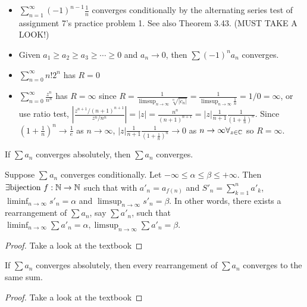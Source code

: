 \begin{example}
	\begin{itemize}
		\item $\sum_{n=1}^{\infty}{(-1)^{n-1}\frac{1}{n}}$ converges conditionally by the alternating series test of assignment 7's practice problem 1. See also Theorem 3.43. (MUST TAKE A LOOK!)
		\item Given $a_1\ge a_2\ge a_3\ge \cdots \ge 0$ and $a_{n}\to 0$, then $\sum{(-1)^{n}a_{n}}$ converges.
		\item $\sum_{n=0}^{\infty}{n!2^{n}}$ has $R=0$
		\item $\sum_{n=0}^{\infty}{\frac{z^{n}}{n^{n}}}$ has $R=\infty$ since $R=\frac{1}{\limsup_{n\to \infty}{\sqrt[n]{|c_{n}|}}}=\frac{1}{\limsup_{n\to \infty}{\frac{1}{n}}}=1/0=\infty$, or use ratio test, $|\frac{z^{n+1}/(n+1)^{n+1}}{z^{n}/n^{n}}|=|z|=\frac{n^{n}}{(n+1)^{n+1}}=|z|\frac{1}{n+1} \frac{1}{(1+\frac{1}{n})^{n}}$.
		      Since $(1+\frac{1}{n})^{n} \to  \frac{1}{e}$ as $n\to \infty$,
		      $|z|\frac{1}{n+1} \frac{1}{(1+\frac{1}{n})^{n}} \to 0$ as $n\to \infty \forall_{z \in \mathbb{C}}$ so $R=\infty$.
	\end{itemize}
\end{example}

\begin{thm}[45]
	If $\sum{a_{n}}$ converges absolutely, then $\sum{a_{n}}$ converges.
\end{thm}

\begin{thm}[54]
	Suppose $\sum_{}{a_{n}}$ converges conditionally.
	Let $-\infty\le \alpha\le \beta\le +\infty$. Then $\exists \text{bijection }f: \mathbb{N}\to \mathbb{N}$ such that with $a'_{n}=a_{f(n)}$ and $S'_n=\sum_{k=1}^{n}{a'_k}$, $\liminf_{n\to \infty}{s'_n}=\alpha$ and $\limsup_{n\to \infty}{s'_n}=\beta$. In other words, there exists a rearrangement of $\sum{a_n}$, say $\sum{a'_n}$, such that $\liminf_{n\to \infty}{\sum{a'_n}}=\alpha, \limsup_{n\to \infty}{\sum{a'_n}}=\beta$.
	\begin{proof}
		Take a look at the textbook
	\end{proof}
\end{thm}

\begin{thm}[55]
	If $\sum{a_{n}}$ converges absolutely, then every rearrangement of $\sum{a_{n}}$ converges to the same sum.
	\begin{proof}
		Take a look at the textbook
	\end{proof}
\end{thm}

